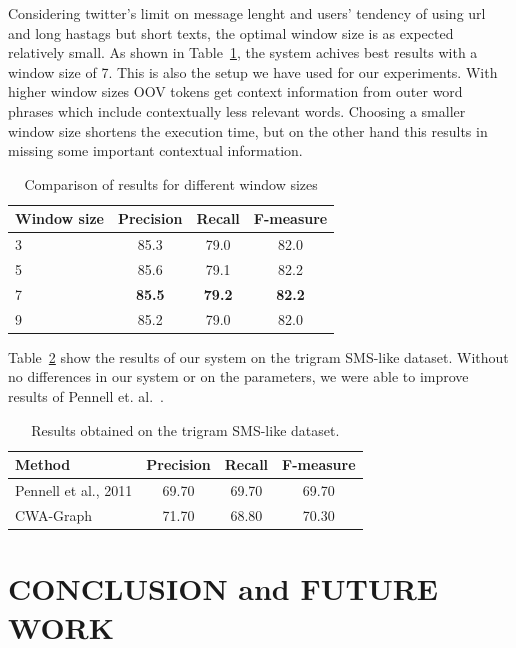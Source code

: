 \documentclass[a4paper,onesided,12pt]{report}
\begin{document}
Considering twitter's limit on message lenght and users' tendency of using url and long hastags but short texts, the optimal window size is as expected relatively small. As shown in Table~\ref{tab:windows}, the system achives best results with a window size of 7. This is also the setup we have used for our experiments. With higher window sizes OOV tokens get context information from outer word phrases which include contextually less relevant words. Choosing a smaller window size shortens the execution time, but on the other hand this results in missing some important contextual information.

\begin{table}[thb]
  \caption{Comparison of results for different window sizes}
  \centering
  \begin{tabular}[th]{lccc}
    \hline
    Window size & Precision & Recall & F-measure \\
    \hline
    3 & 85.3 & 79.0 & 82.0 \\
    5 & 85.6 & 79.1 & 82.2 \\
    7 & \textbf{85.5} &  \textbf{79.2} &  \textbf{82.2} \\
    9 & 85.2 & 79.0  & 82.0 \\
    \hline
  \end{tabular}
\label{tab:windows}
\end{table}

Table~\ref{tab:resultspennell} show the results of our system on the trigram SMS-like dataset. Without no differences in our system or on the parameters, we were able to improve results of Pennell et. al.~\cite{pennell2011character}.

\begin{table}[thb]
  \caption{Results obtained on the trigram SMS-like dataset.}
  \centering
  \begin{tabular}[t]{lccc}
    \hline
    Method & Precision & Recall & F-measure \\
    \hline
    Pennell et al., 2011 & 69.70 & 69.70 & 69.70 \\
    CWA-Graph   & 71.70 & 68.80 & 70.30 \\
    \hline
  \end{tabular}
  \label{tab:resultspennell}
\end{table}

\chapter{CONCLUSION and FUTURE WORK}
\end{document}

